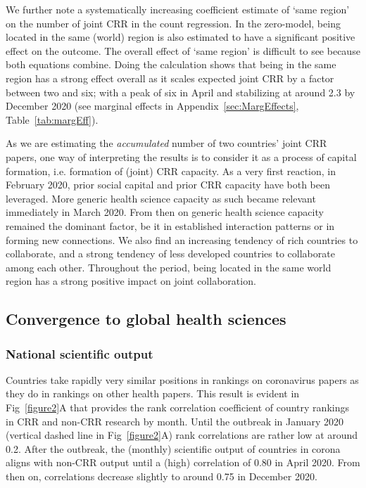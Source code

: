 We further note a systematically increasing coefficient estimate of `same region' on the number of joint CRR in the count regression. In the zero-model, being located in the same (world) region is also estimated to have a significant positive effect on the outcome. The overall effect of `same region' is difficult to see because both equations combine. Doing the calculation shows that being in the same region has a strong effect overall as it scales expected joint CRR by a factor between two and six; with a peak of six in April and stabilizing at around 2.3 by December 2020 (see marginal effects in Appendix~\ref{sec:MargEffects}, Table~\ref{tab:margEff}).  

As we are estimating the \textit{accumulated} number of two countries' joint CRR papers, one way of interpreting the results is to consider it as a process of capital formation, i.e. formation of (joint) CRR capacity. As a very first reaction, in February 2020, prior social capital and prior CRR capacity have both been leveraged. More generic health science capacity as such became relevant immediately in March 2020. From then on generic health science capacity remained the dominant factor, be it in established interaction patterns or in forming new connections. We also find an increasing tendency of rich countries to collaborate, and a strong tendency of less developed countries to collaborate among each other. Throughout the period, being located in the same world region has a strong positive impact on joint collaboration.


\subsection{Convergence to global health sciences}


\subsubsection{National scientific output}

Countries take rapidly very similar positions in rankings on coronavirus papers as they do in rankings on other health papers. This result is evident in Fig~\ref{figure2}A that provides the rank correlation coefficient of country rankings in CRR and non-CRR research by month. Until the outbreak in January 2020 (vertical dashed line in Fig~\ref{figure2}A) rank correlations are rather low at around 0.2. After the outbreak, the (monthly) scientific output of countries in corona aligns with non-CRR output until a (high) correlation of 0.80 in April 2020. From then on, correlations decrease slightly to around 0.75 in December 2020. 



